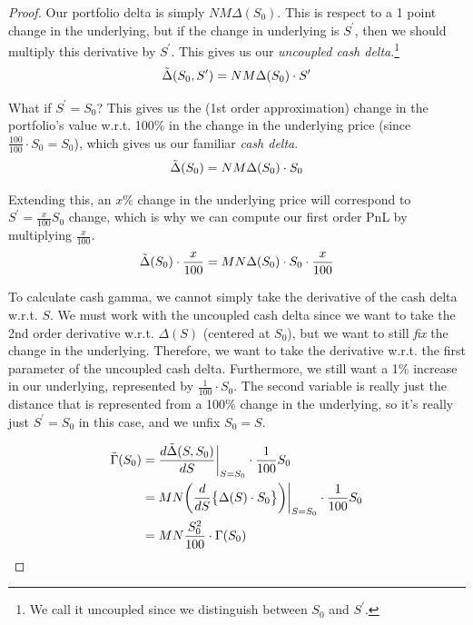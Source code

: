 \documentclass{article}
\begin{document}
    \begin{proof}
      Our portfolio delta is simply $N M \Delta(S_0)$. This is respect to a 1 point change in the underlying, but if the change in underlying is $S^\prime$, then we should multiply this derivative by $S^\prime$. This gives us our \textit{uncoupled cash delta}.\footnote{We call it uncoupled since we distinguish between $S_0$ and $S^\prime$. }
      \begin{equation}
        \Tilde{\Delta} (S_0, S^\prime) = N M \Delta(S_0) \cdot S^\prime
      \end{equation}

      What if $S^\prime = S_0$? This gives us the (1st order approximation) change in the portfolio's value w.r.t. 100\% in the change in the underlying price (since $\frac{100}{100} \cdot S_0 = S_0$), which gives us our familiar \textit{cash delta}. 
      \begin{equation}
        \Tilde{\Delta} (S_0) = N M \Delta(S_0) \cdot S_0
      \end{equation}

      Extending this, an $x\%$ change in the underlying price will correspond to $S^\prime = \frac{x}{100} S_0$ change, which is why we can compute our first order PnL by multiplying $\frac{x}{100}$. 
      \begin{equation}
        \Tilde{\Delta} (S_0) \cdot \frac{x}{100} = M N \Delta (S_0) \cdot S_0 \cdot \frac{x}{100} 
      \end{equation}

      To calculate cash gamma, we cannot simply take the derivative of the cash delta w.r.t. $S$. We must work with the uncoupled cash delta since we want to take the 2nd order derivative w.r.t. $\Delta (S)$ (centered at $S_0$), but we want to still \textit{fix} the change in the underlying. Therefore, we want to take the derivative w.r.t. the first parameter of the uncoupled cash delta. Furthermore, we still want a 1\% increase in our underlying, represented by $\frac{1}{100} \cdot S_0$. The second variable is really just the distance that is represented from a 100\% change in the underlying, so it's really just $S^\prime = S_0$ in this case, and we unfix $S_0 = S$. 

      \begin{align}
        \Tilde{\Gamma} (S_0) & = \frac{d \Tilde{\Delta} (S, S_0)}{d S} \bigg|_{S = S_0} \cdot \frac{1}{100} S_0 \\
        & = M N \bigg( \frac{d}{d S} \big\{ \Delta (S) \cdot S_0 \big\} \bigg) \bigg|_{S = S_0} \cdot \frac{1}{100} S_0 \\
        & = M N \frac{S_0^2}{100} \cdot \Gamma(S_0)
      \end{align}
    \end{proof}
\end{document}
